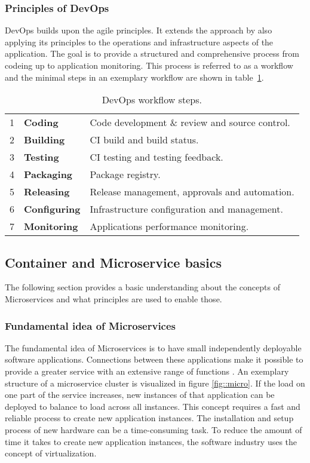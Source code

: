 \documentclass[12pt, a4paper]{article}
\begin{document}
        \subsubsection{Principles of DevOps}
        DevOps builds upon the agile principles. It extends the  approach by also applying its principles to the operations and infrastructure aspects of the application. The goal is to provide a structured and comprehensive process from codeing up to application monitoring. This process is referred to as a workflow and the minimal steps in an exemplary workflow are shown in table~\ref{tab::devops_steps}.
        \begin{table}[h]
            \centering
            \begin{tabularx}{0.85\textwidth}{llX}
            1 & \textbf{Coding}& Code development \& review and source control.  \\
            2 & \textbf{Building}& \acs{CI} build and build status.  \\
            3 & \textbf{Testing}& \acs{CI} testing and testing feedback.  \\
            4 & \textbf{Packaging}& Package registry.  \\
            5 & \textbf{Releasing}& Release management, approvals and automation.  \\
            6 & \textbf{Configuring}& Infrastructure configuration and management.  \\
            7 & \textbf{Monitoring}& Applications performance monitoring.  \\
            \end{tabularx}
            \caption{DevOps workflow steps.}
            \label{tab::devops_steps}
        \end{table}

    \subsection{Container and Microservice basics}
    The following section provides a basic understanding about the concepts of Microservices and what principles are used to enable those.
        \subsubsection{Fundamental idea of Microservices}
        The fundamental idea of Microservices is to have small independently deployable software applications. Connections between these applications make it possible to provide a greater service with an extensive range of functions \cite{micro}. An exemplary structure of a microservice cluster is visualized in figure \ref{fig::micro}. If the load on one part of the service increases, new instances of that application can be deployed to balance to load across all instances. This concept requires a fast and reliable process to create new application instances.\newline
        The installation and setup process of new hardware can be a time-consuming task. To reduce the amount of time it takes to create new application instances, the software industry uses the concept of virtualization.
\end{document}
